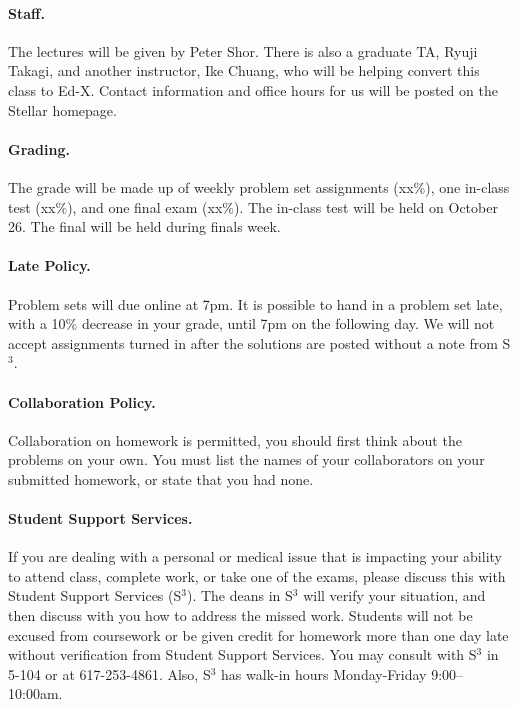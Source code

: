 \documentclass[11pt]{article} 
\begin{document}
\normalfont

\paragraph{Staff.} The lectures will be given by Peter Shor. There is also a
graduate TA, Ryuji Takagi, and another instructor, Ike Chuang, who will be
helping convert this class to Ed-X.  Contact information and office hours for us 
will be posted on the Stellar homepage. 

\paragraph{Grading.} The grade will be made up of weekly
problem set assignments
(xx\%), one in-class test (xx\%), and one final exam (xx\%). 
The in-class test will be held on October 26.
The final will be held during finals week.

\paragraph{Late Policy.} Problem sets will due online at 7pm.
It is possible to hand in a problem set late, with a 10\% decrease 
in your grade, until 7pm on the following day. 
We will not accept assignments turned in after the 
solutions are posted without a note from S$^3$.

\paragraph{Collaboration Policy.} Collaboration on homework is permitted, 
you should first think about the problems on your own. 
You must list the names of your collaborators on your submitted homework, 
or state that you had none. 

\paragraph{Student Support Services.} If you are dealing with a 
personal or medical issue that is impacting your ability to attend 
class, complete work, or take one of the exams, please discuss this 
with Student Support Services (S$^3$). The deans in S$^3$ will 
verify your situation, and then discuss with you how to address the
missed work. Students will not be excused from coursework or be 
given credit for homework more than one day late without verification 
from Student Support Services. You may consult with S$^3$  in 5-104 or 
at 617-253-4861. Also, S$^3$ has walk-in hours Monday-Friday 9:00--10:00am.
\end{document}
